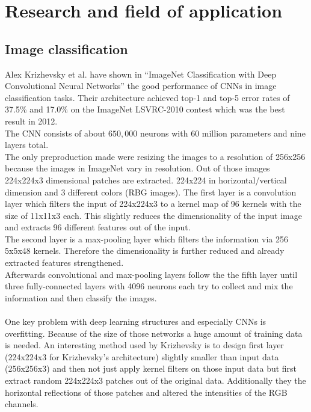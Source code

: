\documentclass[12pt,twoside]{article}
\theoremstyle{plain}
\theoremstyle{definition}
\theoremstyle{remark}
\begin{document}
\section{Research and field of application}
\label{sec:research_and_application}


\subsection{Image classification}

Alex Krizhevsky et al. have shown in \enquote{ImageNet Classification with Deep Convolutional Neural Networks} \cite{ImangeNetClassificationCNN-Krizhevsky} the good performance of CNNs in image classification tasks. Their architecture achieved top-1 and top-5 error rates of 37.5\% and 17.0\% on the ImageNet LSVRC-2010 contest which was the best result in 2012.
\\
The CNN consists of about $650,000$ neurons with $60$ million parameters and nine layers total.
\\
The only preproduction made were resizing the images to a resolution of 256x256 because the images in ImageNet vary in resolution. Out of those images 224x224x3 dimensional patches are extracted. 224x224 in horizontal/vertical dimension and 3 different colors (RBG images). The first layer is a convolution layer which filters the input of 224x224x3 to a kernel map of 96 kernels with the size of 11x11x3 each. This slightly reduces the dimensionality of the input image and extracts 96 different features out of the input.
\\
The second layer is a max-pooling layer which filters the information via 256 5x5x48 kernels. Therefore the dimensionality is further reduced and already extracted features strengthened.
\\
Afterwards convolutional and max-pooling layers follow the the fifth layer until three fully-connected layers with 4096 neurons each try to collect and mix the information and then classify the images.
\\
\\
One key problem with deep learning structures and especially CNNs is overfitting. Because of the size of those networks a huge amount of training data is needed. An interesting method used by Krizhevsky is to design first layer (224x224x3 for Krizhevsky's architecture) slightly smaller than input data (256x256x3) and then not just apply kernel filters on those input data but first extract random 224x224x3 patches out of the original data. Additionally they the horizontal reflections of those patches and altered the intensities of the RGB channels.
\end{document}
